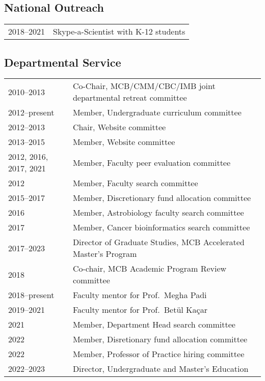 \documentclass[11pt]{article}
\begin{document}
\subsection*{National Outreach}
\begin{longtable}[l]{l l}
2018--2021 & Skype-a-Scientist with K-12 students\\
\end{longtable}

\subsection*{Departmental Service}
\begin{longtable}[l]{l l}
2010--2013 & Co-Chair, MCB/CMM/CBC/IMB joint departmental retreat committee\\
2012--present & Member, Undergraduate curriculum committee\\
2012--2013 & Chair, Website committee\\
2013--2015 & Member, Website committee\\
2012, 2016, 2017, 2021 & Member, Faculty peer evaluation committee\\
2012 & Member, Faculty search committee\\
2015--2017 & Member, Discretionary fund allocation committee\\
2016 & Member, Astrobiology faculty search committee\\
2017 & Member, Cancer bioinformatics search committee\\
2017--2023 & Director of Graduate Studies, MCB Accelerated Master's Program\\
2018 & Co-chair, MCB Academic Program Review committee\\
2018--present & Faculty mentor for Prof.\ Megha Padi\\
2019--2021 & Faculty mentor for Prof.\ Bet{\"u}l Ka{\c c}ar\\
2021 & Member, Department Head search committee\\
2022 & Member, Disretionary fund allocation committee\\
2022 & Member, Professor of Practice hiring committee\\
2022--2023 & Director, Undergraduate and Master's Education
\end{longtable}
\end{document}
